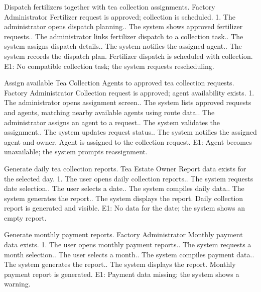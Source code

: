 {Dispatch fertilizers together with tea collection assignments.}
{Factory Administrator}
{Fertilizer request is approved; collection is scheduled.}
{1. The administrator opens dispatch planning.. The system shows approved fertilizer requests.. The administrator links fertilizer dispatch to a collection task.. The system assigns dispatch details.. The system notifies the assigned agent.. The system records the dispatch plan.}
{Fertilizer dispatch is scheduled with collection.}
{E1: No compatible collection task; the system requests rescheduling.}

{Assign available Tea Collection Agents to approved tea collection requests.}
{Factory Administrator}
{Collection request is approved; agent availability exists.}
{1. The administrator opens assignment screen.. The system lists approved requests and agents, matching nearby available agents using route data.. The administrator assigns an agent to a request.. The system validates the assignment.. The system updates request status.. The system notifies the assigned agent and owner.}
{Agent is assigned to the collection request.}
{E1: Agent becomes unavailable; the system prompts reassignment.}

{Generate daily tea collection reports.}
{Tea Estate Owner}
{Report data exists for the selected day.}
{1. The user opens daily collection reports.. The system requests date selection.. The user selects a date.. The system compiles daily data.. The system generates the report.. The system displays the report.}
{Daily collection report is generated and visible.}
{E1: No data for the date; the system shows an empty report.}

{Generate monthly payment reports.}
{Factory Administrator}
{Monthly payment data exists.}
{1. The user opens monthly payment reports.. The system requests a month selection.. The user selects a month.. The system compiles payment data.. The system generates the report.. The system displays the report.}
{Monthly payment report is generated.}
{E1: Payment data missing; the system shows a warning.}

